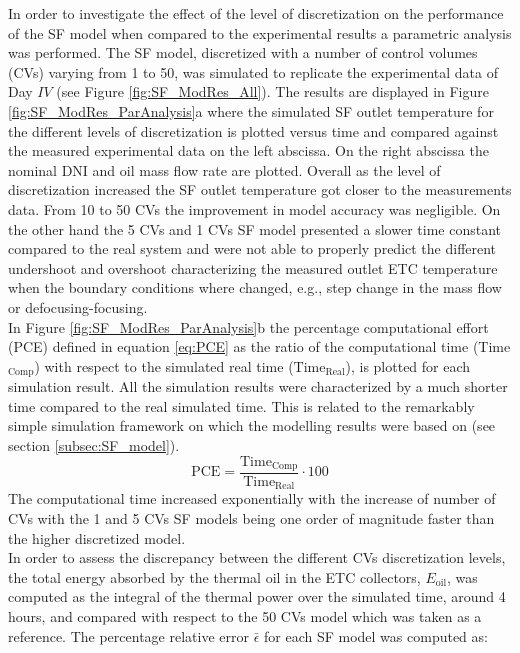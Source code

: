 \documentclass[final,3p,times,review]{elsarticle}
\begin{document}
In order to investigate the effect of the level of discretization on the performance of the SF model when compared to the experimental results a parametric analysis was performed. The SF model, discretized with a number of control volumes (CVs) varying from 1 to 50,  was simulated to replicate the  experimental data of Day $IV$ (see Figure \ref{fig:SF_ModRes_All}). The results are displayed in Figure \ref{fig:SF_ModRes_ParAnalysis}a where the simulated SF outlet temperature for the different levels of discretization is plotted versus time and compared against the measured experimental data on the left abscissa. On the right abscissa the nominal DNI and oil mass flow rate are plotted. Overall as the level of discretization increased the SF outlet temperature got closer to the measurements data. From 10 to 50 CVs the improvement in model accuracy was negligible. On the other hand the 5 CVs and 1 CVs SF model presented a slower time constant compared to the real system and were not able to properly predict the different undershoot and overshoot characterizing the measured outlet ETC temperature when the boundary conditions where changed, e.g., step change in the mass flow or defocusing-focusing.\\
In Figure \ref{fig:SF_ModRes_ParAnalysis}b the percentage computational effort (PCE) defined in equation \ref{eq:PCE} as the ratio of the computational time (Time$_\mathrm{Comp}$) with respect to the simulated real time ($\mathrm{Time}_\mathrm{Real}$), is plotted for each simulation result. All the simulation results were characterized by a much shorter time compared to the real simulated time. This is related to the remarkably simple simulation framework on which the modelling results were based on (see section \ref{subsec:SF_model}). 
%
\begin{equation}
\mathrm{PCE} = \frac{\mathrm{Time}_\mathrm{Comp}}{\mathrm{Time}_\mathrm{Real}} \cdot 100
\label{eq:PCE}
\end{equation}
%
The computational time increased exponentially with the increase of number of CVs with the 1 and 5 CVs SF models being one order of magnitude faster than the higher discretized model.\\
In order to assess the discrepancy between the different CVs discretization levels, the total energy absorbed by the thermal oil in the ETC collectors, $E_\mathrm{oil}$,  was computed as the integral of the thermal power over the simulated time, around 4 hours, and compared with respect to the 50 CVs model which was taken as a reference. The percentage relative error $\bar{\epsilon}$ for each SF model was computed as:
\end{document}
